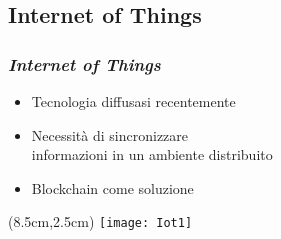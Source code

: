 \subsection{Internet of Things}
\begin{frame}
 \frametitle{\textit{Internet of Things}}

 \begin{itemize}
  \item<1-> Tecnologia diffusasi recentemente
  \item<2-> Necessit\`a di sincronizzare \\ informazioni in un ambiente
distribuito
  \item<3-> Blockchain come soluzione
 \end{itemize}

 \begin{textblock*}{5cm}(8.5cm,2.5cm)
  \texttt{[image: Iot1]}
 \end{textblock*}

\end{frame}